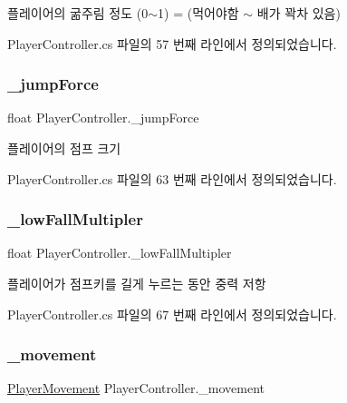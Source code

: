 플레이어의 굶주림 정도 (0$\sim$1) = (먹어야함 $\sim$ 배가 꽉차 있음) 



Player\+Controller.\+cs 파일의 57 번째 라인에서 정의되었습니다.

\mbox{\label{class_player_controller_aaec5e4333fe1c532900ca666c075261c}} 
\subsubsection{\texorpdfstring{\_jumpForce}{\_jumpForce}}
{\footnotesize\ttfamily float Player\+Controller.\+\_\+jump\+Force\hspace{0.3cm}{\ttfamily [private]}}



플레이어의 점프 크기 



Player\+Controller.\+cs 파일의 63 번째 라인에서 정의되었습니다.

\mbox{\label{class_player_controller_a22c8d9bc37fc9e2e9adb147bdf8867ef}} 
\subsubsection{\texorpdfstring{\_lowFallMultipler}{\_lowFallMultipler}}
{\footnotesize\ttfamily float Player\+Controller.\+\_\+low\+Fall\+Multipler\hspace{0.3cm}{\ttfamily [private]}}



플레이어가 점프키를 길게 누르는 동안 중력 저항 



Player\+Controller.\+cs 파일의 67 번째 라인에서 정의되었습니다.

\mbox{\label{class_player_controller_ad788cfe2e37318d22d52010dc0fecd57}} 
\subsubsection{\texorpdfstring{\_movement}{\_movement}}
{\footnotesize\ttfamily \mbox{\hyperlink{class_player_movement}{Player\+Movement}} Player\+Controller.\+\_\+movement\hspace{0.3cm}{\ttfamily [private]}}



